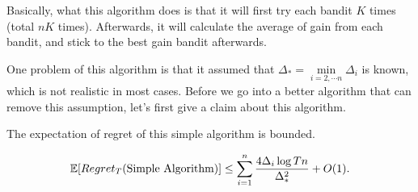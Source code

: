 \documentclass[../main.tex]{subfiles}
\begin{document}
Basically, what this algorithm does is that it will first try each bandit $K$ times (total $nK$ times). Afterwards, it will calculate the average of gain from each bandit, and stick to the best gain bandit afterwards.

One problem of this algorithm is that it assumed that $\Delta_* = \min\limits_{i=2,\cdots n} \Delta_i$ is known, which is not realistic in most cases. Before we go into a better algorithm that can remove this assumption, let's first give a claim about this algorithm.

\begin{claim}
	The expectation of regret of this simple algorithm is bounded.
	
	\begin{equation}
		\mathbb{E}[Regret_T(\textmd{Simple Algorithm})] \leq \sum\limits_{i=1}^n \frac{4 \Delta_i \log Tn}{\Delta_*^2} + O(1).
	\end{equation}
\end{claim}
\end{document}
